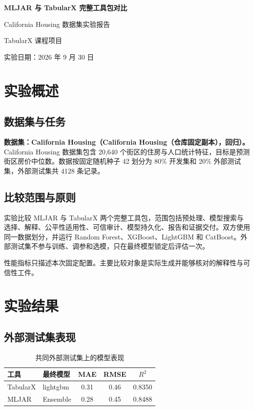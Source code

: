 \documentclass[degree=bachelor,language=chinese,fontset=fandol]{thuthesis}
\begin{document}
\begin{titlepage}
  \centering
  \vspace*{2.3cm}
  {\bfseries MLJAR 与 TabularX 完整工具包对比\par}
  \vspace{1.2cm}
  {California Housing 数据集实验报告\par}
  \vspace{2.2cm}
  {TabularX 课程项目\par}
  \vfill
  {实验日期：2026 年 9 月 30 日\par}
  \vspace{1.2cm}
\end{titlepage}

\frontmatter
\tableofcontents
\mainmatter
\chapter{实验概述}
\section{数据集与任务}
\textbf{数据集：California Housing（California Housing（仓库固定副本），回归）。}
California Housing 数据集包含 20,640 个街区的住房与人口统计特征，目标是预测街区房价中位数。数据按固定随机种子 42 划分为 80\% 开发集和 20\% 外部测试集，外部测试集共 4128 条记录。

\section{比较范围与原则}
实验比较 MLJAR 与 TabularX 两个完整工具包，范围包括预处理、模型搜索与选择、解释、公平性适用性、可信审计、模型持久化、报告和证据交付。双方使用同一数据划分，并运行 Random Forest、XGBoost、LightGBM 和 CatBoost。外部测试集不参与训练、调参和选模，只在最终模型锁定后评估一次。

性能指标只描述本次固定配置。主要比较对象是实际生成并能够核对的解释性与可信性工件。

\chapter{实验结果}
\section{外部测试集表现}
\begin{table}[htbp]
  \centering
  \small
  \caption{共同外部测试集上的模型表现}
  \begin{tabular}{llccc}
    \toprule
    工具 & 最终模型 & MAE & RMSE & $R^2$ \\
    \midrule
    TabularX & lightgbm & 0.31 & 0.46 & 0.8350 \\
    MLJAR & Ensemble & 0.28 & 0.45 & 0.8488 \\
    \bottomrule
  \end{tabular}
\end{table}
\end{document}
